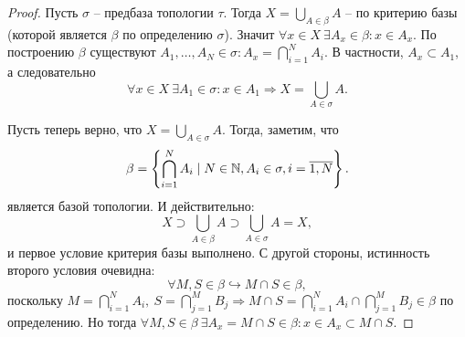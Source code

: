\begin{proof}
    Пусть $\sigma$ -- предбаза топологии $\tau$.
    Тогда $X = \bigcup_{A \in \beta} A$ -- по критерию базы (которой является $\beta$ по определению $\sigma$). Значит $\forall x \in X \ \exists A_x \in \beta\colon x \in A_x$.
    По построению $\beta$ существуют $A_1, \ldots, A_N \in \sigma\colon A_x = \bigcap_{i = 1}^{N} A_i$.
    В частности, $A_x \subset A_1$, а следовательно
    \[
        \forall x \in X \ \exists A_1 \in \sigma \colon x \in A_1 \Rightarrow X = \bigcup_{A \in \sigma} A.
    \]

    Пусть теперь верно, что $X = \bigcup_{A \in \sigma} A$.
    Тогда, заметим, что
    \[
        \beta = \left\{\bigcap_{i = 1}^N A_i \mid N \in \mathbb{N},  A_i \in \sigma, i = \overline{1, N}\right\}.
    \]
    является базой топологии.
    И действительно:
    \[
        X \supset \bigcup_{A \in \beta} A \supset \bigcup_{A \in \sigma} A = X,
    \]
    и первое условие критерия базы выполнено.
    С другой стороны, истинность второго условия очевидна:
    \[
        \forall M, S \in \beta \hookrightarrow M \cap S \in \beta,
    \]
    поскольку $M = \bigcap_{i = 1}^N A_i, \ S = \bigcap_{j = 1}^M B_j \Rightarrow M \cap S = \bigcap_{i = 1}^N A_i \cap  \bigcap_{j = 1}^{M} B_j \in \beta$ по определению.
    Но тогда $\forall M, S \in \beta \ \exists A_x = M \cap S \in \beta \colon x \in A_x \subset M \cap S$.
\end{proof}
